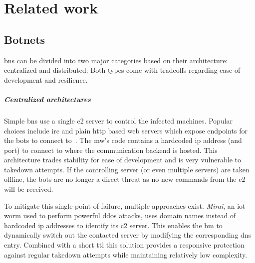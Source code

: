 \chapter{Related work\label{ch:Related_work}}


\section{Botnets\label{sec:Related_work::Botnets}}
\Glspl{bn} can be divided into two major categories based on their architecture: centralized and distributed.
Both types come with tradeoffs regarding ease of development and resilience.

\paragraph*{Centralized architectures}
Simple \glspl{bn} use a single \gls{c2} server to control the infected machines.
Popular choices include \gls{irc} and plain \gls{http} based web servers which expose endpoints for the \glspl{bot} to connect to~\cite{aburajab2006multifaceted}.
The \gls{mw}'s code contains a hardcoded \gls{ip} address (and port) to connect to where the communication backend is hosted.
This architecture trades stability for ease of development and is very vulnerable to takedown attempts.
If the controlling server (or even multiple servers) are taken offline, the \glspl{bot} are no longer a direct threat as no new commands from the \gls{c2} will be received.

To mitigate this single-point-of-failure, multiple approaches exist.
\emph{Mirai}, an \gls{iot} worm used to perform powerful \gls{ddos} attacks, uses domain names instead of hardcoded \gls{ip} addresses to identify its \gls{c2} server.
This enables the \gls{bm} to dynamically switch out the contacted server by modifying the corresponding \acrshort{dns} entry.
Combined with a short \gls{ttl} this solution provides a responsive protection against regular takedown attempts while maintaining relatively low complexity.

